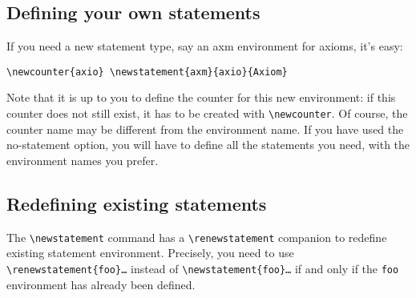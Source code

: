 \documentclass[english,ColorTheme=Red,FontSize=10pt]{tango}
\newcommand\TO[1]{\textsf{#1}}
\begin{document}
\subsection{Defining your own statements}
If you need a new statement type, say an axm environment for axioms, it's easy:
\begin{tcolorbox}
\begin{verbatim}
\newcounter{axio} \newstatement{axm}{axio}{Axiom}
\end{verbatim}
\end{tcolorbox}
Note that it is up to you to define the counter for this new environment: if this counter does not still exist, it has to be created with \verb+\newcounter+. Of course, the counter name may be different from the environment name. If you have used the \TO{no-statement} option, you will have to define all the statements you need, with the environment names you prefer.

\subsection{Redefining existing statements}
The \verb+\newstatement+ command has a \verb+\renewstatement+ companion to redefine existing statement environment. Precisely, you need to use \verb+\renewstatement{foo}…+ instead of \verb+\newstatement{foo}…+ if and only if the \verb+foo+ environment has already been defined.
\end{document}
